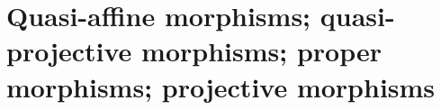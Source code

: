 \section{Quasi-affine morphisms; quasi-projective morphisms; proper morphisms; projective morphisms}
\label{section:quasi-affine-projective-proper-morphisms}

